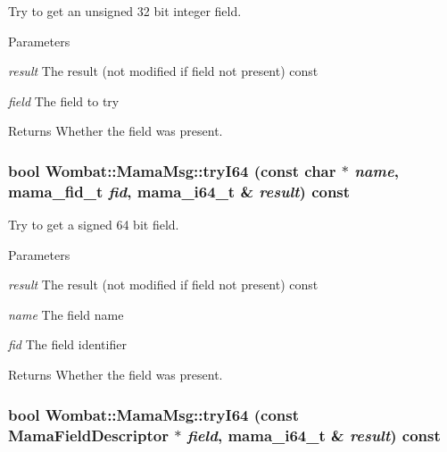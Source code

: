 Try to get an unsigned 32 bit integer field. 
\begin{DoxyParams}{Parameters}
\item[{\em result}]The result (not modified if field not present) const \item[{\em field}]The field to try \end{DoxyParams}
\begin{DoxyReturn}{Returns}
Whether the field was present. 
\end{DoxyReturn}
\hypertarget{classWombat_1_1MamaMsg_ae06ab152da80a5bcaba2e30465f25606}{
\subsubsection[{tryI64}]{\setlength{\rightskip}{0pt plus 5cm}bool Wombat::MamaMsg::tryI64 (const char $\ast$ {\em name}, \/  mama\_\-fid\_\-t {\em fid}, \/  mama\_\-i64\_\-t \& {\em result}) const}}
\label{classWombat_1_1MamaMsg_ae06ab152da80a5bcaba2e30465f25606}


Try to get a signed 64 bit field. 
\begin{DoxyParams}{Parameters}
\item[{\em result}]The result (not modified if field not present) const \item[{\em name}]The field name \item[{\em fid}]The field identifier \end{DoxyParams}
\begin{DoxyReturn}{Returns}
Whether the field was present. 
\end{DoxyReturn}
\hypertarget{classWombat_1_1MamaMsg_a675d9b762142bd3bed9281f94cf8424b}{
\subsubsection[{tryI64}]{\setlength{\rightskip}{0pt plus 5cm}bool Wombat::MamaMsg::tryI64 (const {\bf MamaFieldDescriptor} $\ast$ {\em field}, \/  mama\_\-i64\_\-t \& {\em result}) const}}
\label{classWombat_1_1MamaMsg_a675d9b762142bd3bed9281f94cf8424b}


